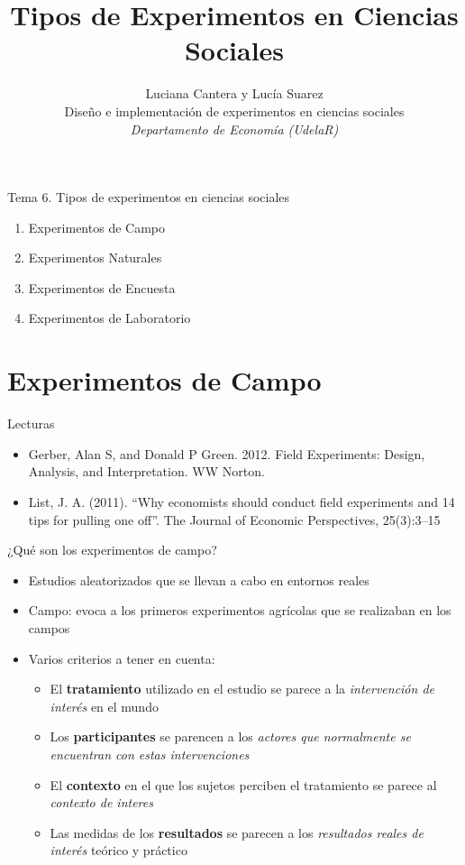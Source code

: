 \documentclass[
  ignorenonframetext,
]{beamer}
\title{Tipos de Experimentos en Ciencias Sociales}
\author{Luciana Cantera y Lucía Suarez\\
Diseño e implementación de experimentos en ciencias sociales\\
\emph{Departamento de Economía (UdelaR)}}
\date{}
\providecommand{\tightlist}{%
  \setlength{\itemsep}{0pt}\setlength{\parskip}{0pt}}
\begin{document}
\frame{\titlepage}

\begin{frame}{Tema 6. Tipos de experimentos en ciencias sociales}
\protect\hypertarget{tema-6.-tipos-de-experimentos-en-ciencias-sociales}{}
\begin{enumerate}
\tightlist
\item
  Experimentos de Campo
\item
  Experimentos Naturales
\item
  Experimentos de Encuesta
\item
  Experimentos de Laboratorio
\end{enumerate}
\end{frame}

\hypertarget{experimentos-de-campo}{%
\section{Experimentos de Campo}\label{experimentos-de-campo}}

\begin{frame}{Lecturas}
\protect\hypertarget{lecturas}{}
\begin{itemize}
\item
  Gerber, Alan S, and Donald P Green. 2012. Field Experiments: Design,
  Analysis, and Interpretation. WW Norton.
\item
  List, J. A. (2011). ``Why economists should conduct field experiments
  and 14 tips for pulling one off''. The Journal of Economic
  Perspectives, 25(3):3--15
\end{itemize}
\end{frame}

\begin{frame}{¿Qué son los experimentos de campo?}
\protect\hypertarget{quuxe9-son-los-experimentos-de-campo}{}
\begin{itemize}
\tightlist
\item
  Estudios aleatorizados que se llevan a cabo en entornos reales
\item
  Campo: evoca a los primeros experimentos agrícolas que se realizaban
  en los campos
\item
  Varios criterios a tener en cuenta:

  \begin{itemize}
  \tightlist
  \item
    El \textbf{tratamiento} utilizado en el estudio se parece a la
    \emph{intervención de interés} en el mundo
  \item
    Los \textbf{participantes} se parencen a los \emph{actores que
    normalmente se encuentran con estas intervenciones}
  \item
    El \textbf{contexto} en el que los sujetos perciben el tratamiento
    se parece al \emph{contexto de interes}
  \item
    Las medidas de los \textbf{resultados} se parecen a los
    \emph{resultados reales de interés} teórico y práctico
  \end{itemize}
\end{itemize}
\end{frame}
\end{document}
